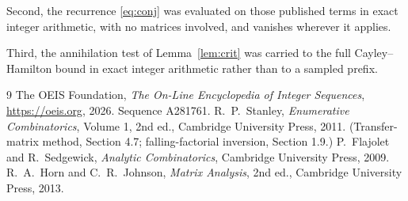 \documentclass[11pt,a4paper]{article}
\theoremstyle{plain}
\theoremstyle{definition}
\begin{document}
Second, the recurrence \eqref{eq:conj} was evaluated on those published terms in exact
integer arithmetic, with no matrices involved, and vanishes wherever it applies.

Third, the annihilation test of Lemma~\ref{lem:crit} was carried to the full
Cayley--Hamilton bound in exact integer arithmetic rather than to a sampled prefix.

\begin{thebibliography}{9}
 The OEIS Foundation, \emph{The On-Line Encyclopedia of Integer
Sequences}, \url{https://oeis.org}, 2026. Sequence A281761.
 R.~P.~Stanley, \emph{Enumerative Combinatorics}, Volume 1, 2nd ed.,
Cambridge University Press, 2011. (Transfer-matrix method, Section 4.7; falling-factorial
inversion, Section 1.9.)
 P.~Flajolet and R.~Sedgewick, \emph{Analytic Combinatorics}, Cambridge
University Press, 2009.
 R.~A.~Horn and C.~R.~Johnson, \emph{Matrix Analysis}, 2nd ed., Cambridge
University Press, 2013.
\end{thebibliography}
\end{document}
